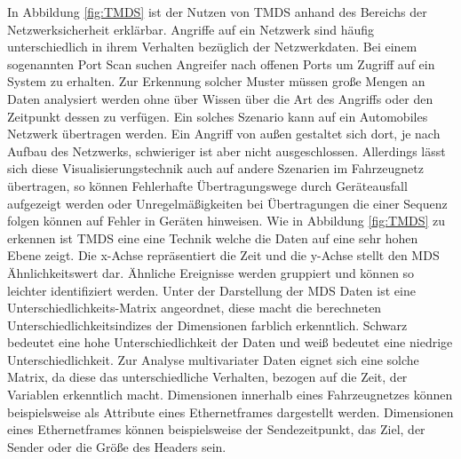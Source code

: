 \documentclass[draft=false
              ,paper=a4
              ,twoside=false
              ,fontsize=11pt
              ,headsepline
              ,BCOR10mm
              ,DIV11
              ]{scrbook}
\begin{document}
In Abbildung \ref{fig:TMDS} ist der Nutzen von TMDS anhand des Bereichs der Netzwerksicherheit erklärbar. Angriffe auf ein Netzwerk sind häufig unterschiedlich in ihrem Verhalten bezüglich der Netzwerkdaten. Bei einem sogenannten Port Scan suchen Angreifer nach offenen Ports um Zugriff auf ein System zu erhalten. Zur Erkennung solcher Muster müssen große Mengen an Daten analysiert werden ohne über Wissen über die Art des Angriffs oder den Zeitpunkt dessen zu verfügen. Ein solches Szenario kann auf ein Automobiles Netzwerk übertragen werden. Ein Angriff von außen gestaltet sich dort, je nach Aufbau des Netzwerks, schwieriger ist aber nicht ausgeschlossen. Allerdings lässt sich diese Visualisierungstechnik auch auf andere Szenarien im Fahrzeugnetz übertragen, so können Fehlerhafte Übertragungswege durch Geräteausfall aufgezeigt werden oder Unregelmäßigkeiten bei Übertragungen die einer Sequenz folgen können auf Fehler in Geräten hinweisen. Wie in Abbildung \ref{fig:TMDS} zu erkennen ist TMDS eine eine Technik welche die Daten auf eine sehr hohen Ebene zeigt. Die x-Achse repräsentiert die Zeit und die y-Achse stellt den MDS Ähnlichkeitswert dar. Ähnliche Ereignisse werden gruppiert und können so leichter identifiziert werden. Unter der Darstellung der MDS Daten ist eine Unterschiedlichkeits-Matrix angeordnet, diese macht die berechneten Unterschiedlichkeitsindizes der Dimensionen farblich erkenntlich. Schwarz bedeutet eine hohe Unterschiedlichkeit der Daten und weiß bedeutet eine niedrige Unterschiedlichkeit. Zur Analyse multivariater Daten eignet sich eine solche Matrix, da diese das unterschiedliche Verhalten, bezogen auf die Zeit, der Variablen erkenntlich macht.  Dimensionen innerhalb eines Fahrzeugnetzes können beispielsweise als Attribute eines Ethernetframes dargestellt werden. Dimensionen eines Ethernetframes können beispielsweise der Sendezeitpunkt, das Ziel, der Sender oder die Größe des Headers sein.
\end{document}

